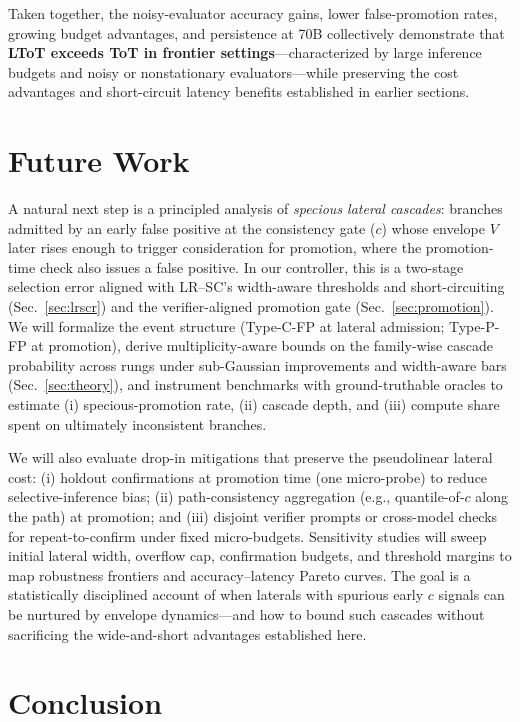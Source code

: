 \documentclass{article}
\begin{document}
Taken together, the noisy-evaluator accuracy gains, lower false-promotion rates, growing budget advantages, and persistence at 70B collectively demonstrate that \textbf{LToT exceeds ToT in frontier settings}—characterized by large inference budgets and noisy or nonstationary evaluators—while preserving the cost advantages and short-circuit latency benefits established in earlier sections.

\section{Future Work}
\label{section:future-work}

A natural next step is a principled analysis of \emph{specious lateral cascades}: branches admitted by an early false positive at the consistency gate (\(c\)) whose envelope \(V\) later rises enough to trigger consideration for promotion, where the promotion-time check also issues a false positive. In our controller, this is a two-stage selection error aligned with LR--SC’s width-aware thresholds and short-circuiting (Sec.~\ref{sec:lrscr}) and the verifier-aligned promotion gate (Sec.~\ref{sec:promotion}). We will formalize the event structure (Type-C-FP at lateral admission; Type-P-FP at promotion), derive multiplicity-aware bounds on the family-wise cascade probability across rungs under sub-Gaussian improvements and width-aware bars (Sec.~\ref{sec:theory}), and instrument benchmarks with ground-truthable oracles to estimate (i) specious-promotion rate, (ii) cascade depth, and (iii) compute share spent on ultimately inconsistent branches.

We will also evaluate drop-in mitigations that preserve the pseudolinear lateral cost: (i) holdout confirmations at promotion time (one micro-probe) to reduce selective-inference bias; (ii) path-consistency aggregation (e.g., quantile-of-\(c\) along the path) at promotion; and (iii) disjoint verifier prompts or cross-model checks for repeat-to-confirm under fixed micro-budgets. Sensitivity studies will sweep initial lateral width, overflow cap, confirmation budgets, and threshold margins to map robustness frontiers and accuracy–latency Pareto curves. The goal is a statistically disciplined account of when laterals with spurious early \(c\) signals can be nurtured by envelope dynamics—and how to bound such cascades without sacrificing the wide-and-short advantages established here.

\section{Conclusion}
\label{section:conclusion}
\end{document}
